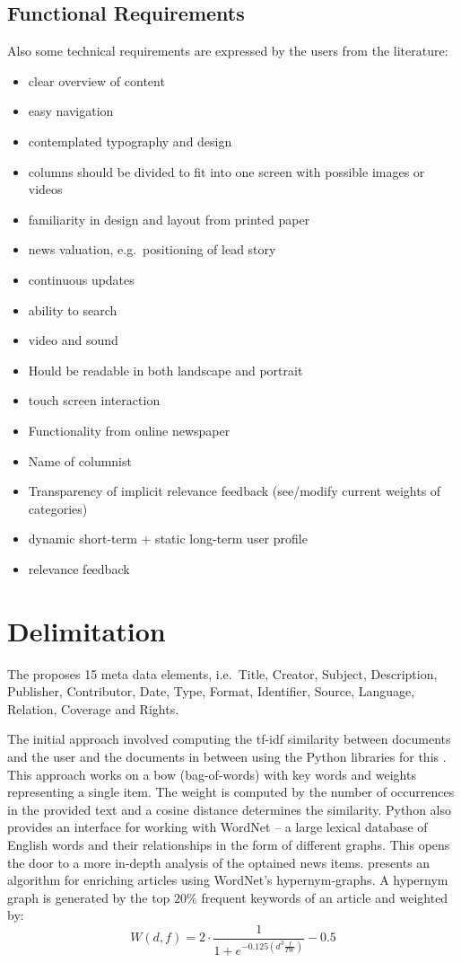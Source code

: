 \subsection{Functional Requirements}
Also some technical requirements are expressed by the users from the literature:
\begin{itemize}
	\item clear overview of content
	\item easy navigation
	\item contemplated typography and design
	\item columns should be divided to fit into one screen with possible images or videos
	\item familiarity in design and layout from printed paper
	\item news valuation, e.g.\ positioning of lead story
	\item continuous updates
	\item ability to search
	\item video and sound
	\item Hould be readable in both landscape and portrait
	\item touch screen interaction
	\item Functionality from online newspaper
	\item Name of columnist
	\item Transparency of implicit relevance feedback (see/modify current weights of categories)
	\item dynamic short-term + static long-term user profile
	\item relevance feedback
\end{itemize}

\section{Delimitation}
The \cite{DCMI} proposes 15 meta data elements, i.e.\ Title, Creator, Subject, Description, Publisher, Contributor, Date, Type, Format, Identifier, Source, Language, Relation, Coverage and Rights.

The initial approach involved computing the tf-idf similarity between documents and the user and the documents in between using the Python libraries for this \cite{NLTK}. This approach works on a bow (bag-of-words) with key words and weights representing a single item. The weight is computed by the number of occurrences in the provided text and a cosine distance determines the similarity. Python also provides an interface for working with WordNet -- a large lexical database of English words and their relationships in the form of different graphs. This opens the door to a more in-depth analysis of the optained news items. \cite{116262780379.pdf} presents an algorithm for enriching articles using WordNet's hypernym-graphs. A hypernym graph is generated by the top $20\%$ frequent keywords of an article and weighted by:
$$W(d, f) = 2 \cdot \frac{1}{1+e^{-0.125(d^3\frac{f}{TW})}}-0.5$$

